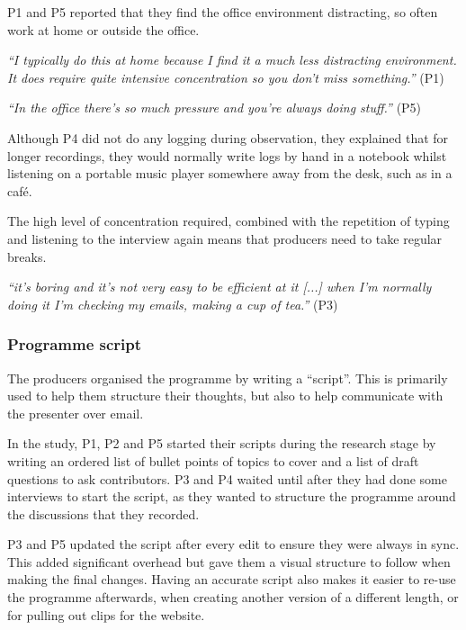 P1 and P5 reported that they find the office environment distracting, so often work at home or outside the office.

\textit{``I typically do this at home because I find it a much less distracting
  environment. It does require quite intensive concentration so you don't miss
  something.''} (P1)

\textit{``In the office there's so much pressure and you're always doing stuff.''} (P5)

Although P4 did not do any logging during observation, they explained that for longer recordings, they
would normally write logs by hand in a notebook whilst listening on a
portable music player somewhere away from the desk, such as in a caf\'e.

The high level of concentration required, combined with the repetition of 
typing and listening to the interview again means that producers need to take
regular breaks.

\textit{``it's boring and it's not very easy to be efficient at it [...] when
  I'm normally doing it I'm checking my emails, making a cup of tea.''} (P3)

\subsubsection{Programme script}
The producers organised the programme by writing a ``script''. This is primarily used to help them structure their
thoughts, but also to help communicate with the presenter over email.

In the study, P1, P2 and P5 started their scripts during the research stage by writing an ordered list of bullet points
of topics to cover and a list of draft questions to ask contributors.  P3 and P4 waited until after they had done some
interviews to start the script, as they wanted to structure the programme around the discussions that they recorded.

P3 and P5 updated the script after every edit to ensure they were always in sync. This added significant overhead but
gave them a visual structure to follow when making the final changes.
Having an accurate script also makes it easier to re-use the programme afterwards, when creating another version of a
different length, or for pulling out clips for the website.

